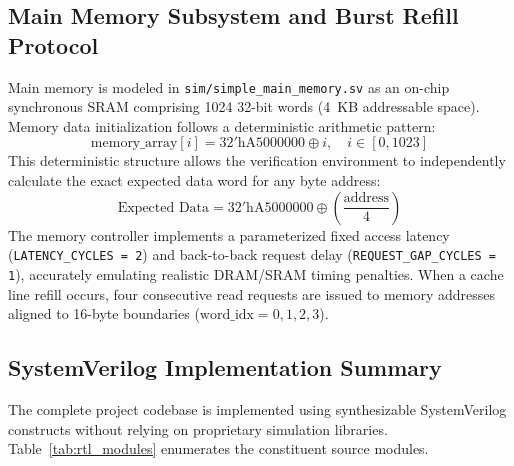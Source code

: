\documentclass[conference]{IEEEtran}
\begin{document}
\subsection{Main Memory Subsystem and Burst Refill Protocol}
Main memory is modeled in \texttt{sim/simple\_main\_memory.sv} as an on-chip synchronous SRAM comprising 1024 32-bit words (4~KB addressable space). Memory data initialization follows a deterministic arithmetic pattern:
\begin{equation}
\text{memory\_array}[i] = 32'\text{hA5000000} \oplus i, \quad i \in [0, 1023]
\end{equation}
This deterministic structure allows the verification environment to independently calculate the exact expected data word for any byte address:
\begin{equation}
\text{Expected Data} = 32'\text{hA5000000} \oplus \left( \frac{\text{address}}{4} \right)
\end{equation}
The memory controller implements a parameterized fixed access latency (\texttt{LATENCY\_CYCLES = 2}) and back-to-back request delay (\texttt{REQUEST\_GAP\_CYCLES = 1}), accurately emulating realistic DRAM/SRAM timing penalties. When a cache line refill occurs, four consecutive read requests are issued to memory addresses aligned to 16-byte boundaries ($\text{word\_idx} = 0, 1, 2, 3$).

\subsection{SystemVerilog Implementation Summary}
The complete project codebase is implemented using synthesizable SystemVerilog constructs without relying on proprietary simulation libraries. Table~\ref{tab:rtl_modules} enumerates the constituent source modules.
\end{document}
